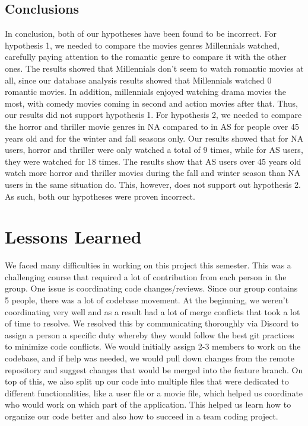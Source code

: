 \documentclass[12pt]{article}
\begin{document}
\subsection{Conclusions}
In conclusion, both of our hypotheses have been found to be incorrect. For hypothesis 1, we needed to compare the movies genres Millennials watched, carefully paying attention to the romantic genre to compare it with the other ones. The results showed that Millennials don't seem to watch romantic movies at all, since our database analysis results showed that Millennials watched 0 romantic movies. In addition, millennials enjoyed watching drama movies the most, with comedy movies coming in second and action movies after that. Thus, our results did not support hypothesis 1. For hypothesis 2,  we needed to compare the horror and thriller movie genres in NA compared to in AS for people over 45 years old and for the winter and fall seasons only. Our results showed that for NA users, horror and thriller were only watched a total of 9 times, while for AS users, they were watched for 18 times. The results show that AS users over 45 years old watch more horror and thriller movies during the fall and winter season than NA users in the same situation do. This, however, does not support out hypothesis 2. As such, both our hypotheses were proven incorrect. 

\section{Lessons Learned}

We faced many difficulties in working on this project this semester. This was a challenging course that required a lot of contribution from each person in the group. One issue is coordinating code changes/reviews. Since our group contains 5 people, there was a lot of codebase movement. At the beginning, we weren't coordinating very well and as a result had a lot of merge conflicts that took a lot of time to resolve. We resolved this by communicating thoroughly via Discord to assign a person a specific duty whereby they would follow the best git practices to minimize code conflicts. We would initially assign 2-3 members to work on the codebase, and if help was needed, we would pull down changes from the remote repository and suggest changes that would be merged into the feature branch. On top of this, we also split up our code into multiple files that were dedicated to different functionalities, like a user file or a movie file, which helped us coordinate who would work on which part of the application. This helped us learn how to organize our code better and also how to succeed in a team coding project.\\
\end{document}
